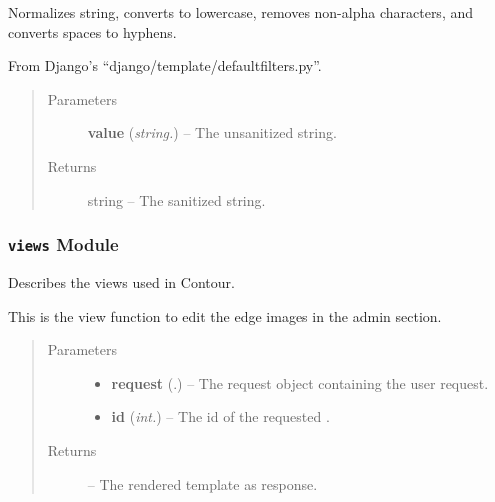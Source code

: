 \documentclass[letterpaper,10pt,english]{sphinxmanual}
\begin{document}
\begin{fulllineitems}
\label{Contour.contour:Contour.contour.util.slugify}
Normalizes string, converts to lowercase, removes non-alpha characters,
and converts spaces to hyphens.

From Django's ``django/template/defaultfilters.py''.
\begin{quote}\begin{description}
\item[{Parameters}] \leavevmode
\textbf{value} (\emph{string.}) -- The unsanitized string.

\item[{Returns}] \leavevmode
string -- The sanitized string.

\end{description}\end{quote}

\end{fulllineitems}



\subsubsection{\texttt{views} Module}
\label{Contour.contour:module-Contour.contour.views}\label{Contour.contour:views-module}
Describes the views used in Contour.

\begin{fulllineitems}
\label{Contour.contour:Contour.contour.views.admin_edge_image}
This is the view function to edit the edge images in the admin section.
\begin{quote}\begin{description}
\item[{Parameters}] \leavevmode\begin{itemize}
\item {} 
\textbf{request} (.) -- The request object containing the user request.

\item {} 
\textbf{id} (\emph{int.}) -- The id of the requested {\hyperref[Contour.contour:Contour.contour.models.Image]{}}.

\end{itemize}

\item[{Returns}] \leavevmode
{} -- The rendered template as response.

\end{description}\end{quote}

\end{fulllineitems}
\end{document}

